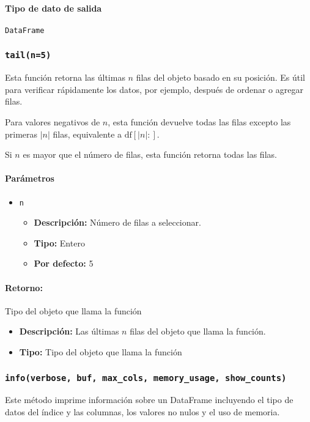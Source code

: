         \paragraph{Tipo de dato de salida} \texttt{DataFrame}

        \subsubsection{\texttt{tail(n=5)}} Esta función retorna las últimas \( n \) filas del objeto basado en su posición. Es útil para verificar rápidamente los datos, por ejemplo, después de ordenar o agregar filas.

        Para valores negativos de \( n \), esta función devuelve todas las filas excepto las primeras \( |n| \) filas, equivalente a \( \text{df}[|n|:] \).

        Si \( n \) es mayor que el número de filas, esta función retorna todas las filas.

        \paragraph{\textbf{Parámetros}}
        \begin{itemize}
            \item \texttt{n}
                \begin{itemize}
                    \item \textbf{Descripción:} Número de filas a seleccionar.
                    \item \textbf{Tipo:} Entero
                    \item \textbf{Por defecto:} 5
                \end{itemize}
        \end{itemize}

        \paragraph{Retorno:} Tipo del objeto que llama la función
        \begin{itemize}
            \item \textbf{Descripción:} Las últimas \( n \) filas del objeto que llama la función.
            \item \textbf{Tipo:} Tipo del objeto que llama la función
        \end{itemize}



        \subsubsection{\texttt{info(verbose, buf, max\_cols, memory\_usage, show\_counts)}} Este método imprime información sobre un DataFrame incluyendo el tipo de datos del índice y las columnas, los valores no nulos y el uso de memoria.

